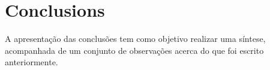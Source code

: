 

\chapter{Conclusions}
\label{ch:conclusions}

A apresentação das conclusões tem como objetivo realizar uma síntese, acompanhada de um conjunto de observações acerca do que foi escrito anteriormente.